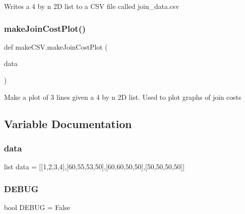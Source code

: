 \begin{DoxyVerb}Writes a 4 by n 2D list to a CSV file called join_data.csv \end{DoxyVerb}
 \mbox{\label{namespacemake_c_s_v_aae06ec5a9c945ceb7cf58ed6874d6ed8}} 
\subsubsection{\texorpdfstring{make\+Join\+Cost\+Plot()}{makeJoinCostPlot()}}
{\footnotesize\ttfamily def make\+C\+S\+V.\+make\+Join\+Cost\+Plot (\begin{DoxyParamCaption}\item[{}]{data }\end{DoxyParamCaption})}

\begin{DoxyVerb}Make a plot of 3 lines given a 4 by n 2D list. Used to plot graphs of join costs \end{DoxyVerb}
 

\subsection{Variable Documentation}
\mbox{\label{namespacemake_c_s_v_a018aaab493af92ea83348b0db6e32328}} 
\subsubsection{\texorpdfstring{data}{data}}
{\footnotesize\ttfamily list data = \mbox{[}\mbox{[}1,2,3,4\mbox{]},\mbox{[}60,55,53,50\mbox{]},\mbox{[}60,60,50,50\mbox{]},\mbox{[}50,50,50,50\mbox{]}\mbox{]}}

\mbox{\label{namespacemake_c_s_v_a117352cc494cc62c6b2f1882786a332c}} 
\subsubsection{\texorpdfstring{D\+E\+B\+UG}{DEBUG}}
{\footnotesize\ttfamily bool D\+E\+B\+UG = False}

